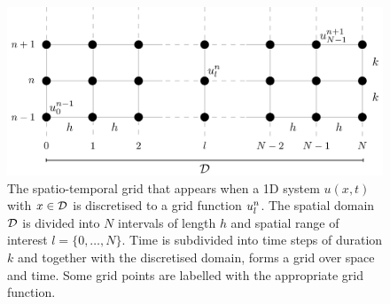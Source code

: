 \begin{figure}[h]
    \centering
    \includegraphics[width=\textwidth]{figures/fdtd/gridFigure3.pdf}
    \caption{The spatio-temporal grid that appears when a 1D system $u(x,t)$ with $x\in \mathcal{D}$ is discretised to a grid function $u_l^n$. The spatial domain $\mathcal{D}$ is divided into $N$ intervals of length $h$ and spatial range of interest $l=\{0, \hdots, N\}$. Time is subdivided into time steps of duration $k$ and together with the discretised domain, forms a grid over space and time. Some grid points are labelled with the appropriate grid function. \label{fig:gridExp}}
\end{figure}


